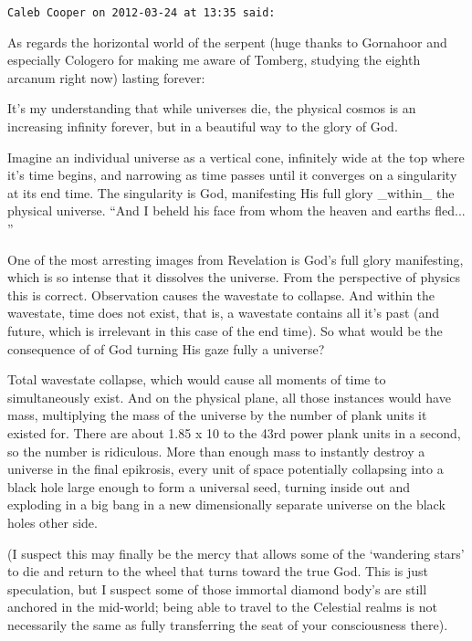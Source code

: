 \begin{footnotesize}
\begin{sffamily}
\texttt{Caleb Cooper on 2012-03-24 at 13:35 said:}

As regards the horizontal world of the serpent (huge thanks to Gornahoor and especially Cologero for making me aware of Tomberg, studying the eighth arcanum right now) lasting forever:

It's my understanding that while universes die, the physical cosmos is an increasing infinity forever, but in a beautiful way to the glory of God.

Imagine an individual universe as a vertical cone, infinitely wide at the top where it's time begins, and narrowing as time passes until it converges on a singularity at its end time. The singularity is God, manifesting His full glory \_within\_ the physical universe. ``And I beheld his face from whom the heaven and earths fled... ''

One of the most arresting images from Revelation is God's full glory manifesting, which is so intense that it dissolves the universe. From the perspective of physics this is correct. Observation causes the wavestate to collapse. And within the wavestate, time does not exist, that is, a wavestate contains all it's past (and future, which is irrelevant in this case of the end time). So what would be the consequence of of God turning His gaze fully a universe?

Total wavestate collapse, which would cause all moments of time to simultaneously exist. And on the physical plane, all those instances would have mass, multiplying the mass of the universe by the number of plank units it existed for. There are about 1.85 x 10 to the 43rd power plank units in a second, so the number is ridiculous. More than enough mass to instantly destroy a universe in the final epikrosis, every unit of space potentially collapsing into a black hole large enough to form a universal seed, turning inside out and exploding in a big bang in a new dimensionally separate universe on the black holes other side.

(I suspect this may finally be the mercy that allows some of the `wandering stars' to die and return to the wheel that turns toward the true God. This is just speculation, but I suspect some of those immortal diamond body's are still anchored in the mid-world; being able to travel to the Celestial realms is not necessarily the same as fully transferring the seat of your consciousness there).


\end{sffamily}
\end{footnotesize}
